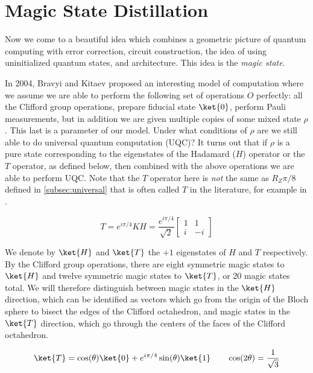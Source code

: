 \section{Magic State Distillation}
\label{sec:magic}

Now we come to a beautiful idea which combines a geometric picture of
quantum computing with error correction, circuit construction, the idea of
using uninitialized quantum states, and architecture.
This idea is the \emph{magic state}.

In 2004, Bravyi and Kitaev proposed an interesting model of computation where
we assume we are able to perform the following set of operations $O$
perfectly: all the Clifford group operations,
prepare fiducial state $\ket{0}$, perform Pauli measurements, but in
addition we are given multiple copies of some mixed state $\rho$
\cite{Bravyi2004}. This last
is a parameter of our model. Under what conditions of $\rho$ are we still
able to do universal quantum computation (\textsc{UQC})? It turns out that
if $\rho$ is a pure state corresponding to the eigenstates of the Hadamard
($H$) operator or the $T$ operator, as defined below, then combined with the
above operations we are able to perform \textsc{UQC}. Note that the
$T$ operator here is \emph{not} the same as $R_Z{\pi/8}$ defined in
\ref{subsec:universal} that is
often called $T$ in the literature, for example in \cite{Nielsen2000}.

\begin{equation}
T = e^{i\pi / 4} KH = \frac{e^{i\pi/4}}{\sqrt{2}}
\left[ \begin{array}{cc}
1 & 1\\
i & -i
\end{array} \right]
\end{equation}

We denote by $\ket{H}$ and $\ket{T}$ the $+1$ eigenstates of $H$ and $T$
respectively. By the Clifford group operations, there are eight symmetric
magic states to $\ket{H}$ and twelve symmetric magic states to $\ket{T}$,
or $20$ magic states total. We will therefore distinguish between
magic states in the $\ket{H}$ direction, which can be identified as vectors
which go from the origin of the Bloch sphere to bisect the edges of the
Clifford octahedron, and magic states in the $\ket{T}$ direction, which
go through the centers of the faces of the Clifford octahedron.

\begin{equation}
\ket{T} = \cos(\theta) \ket{0} + e^{i\pi / 4}\sin(\theta) \ket{1} \qquad
\cos(2\theta) = \frac{1}{\sqrt{3}}
\end{equation}

